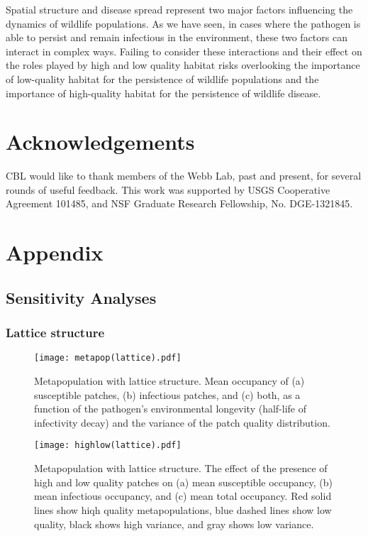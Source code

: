 \documentclass{svjour3}
\begin{document}
Spatial structure and disease spread represent two major factors influencing the dynamics of wildlife populations.  As we have seen, in cases where the pathogen is able to persist and remain infectious in the environment, these two factors can interact in complex ways.  Failing to consider these interactions and their effect on the roles played by high and low quality habitat risks overlooking the importance of low-quality habitat for the persistence of wildlife populations and the importance of high-quality habitat for the persistence of wildlife disease.

\section{Acknowledgements}

CBL would like to thank members of the Webb Lab, past and present, for several rounds of useful feedback.  This work was supported by USGS Cooperative Agreement 101485, and NSF Graduate Research Fellowship, No. DGE-1321845.


\clearpage

\section{Appendix}

\subsection{Sensitivity Analyses}

\subsubsection{Lattice structure}

\begin{figure}[h!]
\centering
\texttt{[image: metapop(lattice).pdf]}
\caption{Metapopulation with lattice structure.  Mean occupancy of (a) susceptible patches, (b) infectious patches, and (c) both, as a function of the pathogen's environmental longevity (half-life of infectivity decay) and the variance of the patch quality distribution.}
\label{poutcome_lattice}
\end{figure}   

\begin{figure}
\centering
\texttt{[image: highlow(lattice).pdf]}
\caption{Metapopulation with lattice structure.  The effect of the presence of high and low quality patches on (a) mean susceptible occupancy, (b) mean infectious occupancy, and (c) mean total occupancy.  Red solid lines show hiqh quality metapopulations, blue dashed lines show low quality, black shows high variance, and gray shows low variance.}
\label{sens_lattice}
\end{figure}
\end{document}
